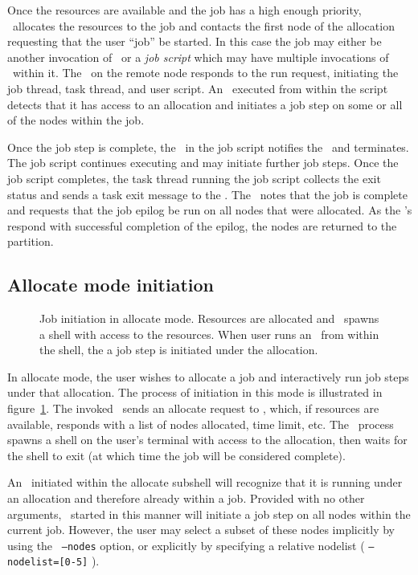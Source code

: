 Once the resources are available and the job has a high enough priority,
\slurmctld\ allocates the resources to the job and contacts the first node 
of the allocation requesting that the user ``job'' be started. In this case
the job may either be another invocation of \srun\ or a {\em job script} which
may have multiple invocations of \srun\ within it. The \slurmd\ on the remote
node responds to the run request, initiating the job thread, task thread, 
and user script. An \srun\ executed from within the script detects that it
has access to an allocation and initiates a job step on some or all of the
nodes within the job.

Once the job step is complete, the \srun\ in the job script notifies the
\slurmctld\, and terminates. The job script continues executing and may
initiate further job steps. Once the job script completes, the task
thread running the job script collects the exit status and sends a task exit
message to the \slurmctld . The \slurmctld\ notes that the job is complete
and requests that the job epilog be run on all nodes that were allocated.
As the \slurmd 's respond with successful completion of the epilog, 
the nodes are returned to the partition.

\subsection{Allocate mode initiation}

\begin{figure}[tb]
\centerline{ }
\caption{\small Job initiation in allocate mode. Resources are allocated and
         \srun\ spawns a shell with access to the resources. When user runs 
	 an \srun\ from within the shell, the a job step is initiated under
	 the allocation.}
\label{init-allocate}
\end{figure}

In allocate mode, the user wishes to allocate a job and interactively run
job steps under that allocation. The process of initiation in this mode
is illustrated in figure~\ref{init-allocate}. The invoked \srun\ sends
an allocate request to \slurmctld , which, if resources are available,
responds with a list of nodes allocated, time limit, etc. The \srun\
process spawns a shell on the user's terminal with access to the
allocation,  then waits for the shell to exit (at which time the job
will be considered complete). 

An \srun\ initiated within the allocate subshell will recognize that it
is running under an allocation and therefore already within a job. Provided
with no other arguments, \srun\ started in this manner will initiate a job
step on all nodes within the current job. However, the user may select
a subset of these nodes implicitly by using the \srun\ {\tt --nodes}  
option, or explicitly by specifying a relative nodelist 
( {\tt --nodelist=[0-5]} ). 

